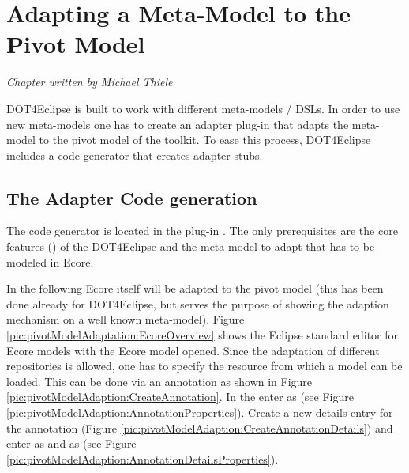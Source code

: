 \chapter{Adapting a Meta-Model to the Pivot Model}
\label{chapter:pivotModelAdaptation}

\begin{flushright}
\textit{Chapter written by Michael Thiele}
\end{flushright}

\acl{DOT4Eclipse} is built to work with different meta-models / DSLs. In order to use new meta-models one has to create an adapter plug-in that adapts the meta-model to the pivot model of the toolkit. To ease this process, \acl{DOT4Eclipse} includes a code generator that creates adapter stubs.



\section{The Adapter Code generation}

The code generator is located in the plug-in . The only prerequisites are the core features () of the \acl{DOT4Eclipse} and the meta-model to adapt that has to be modeled in Ecore.

In the following Ecore itself will be adapted to the pivot model (this has been done already for \acl{DOT4Eclipse}, but serves the purpose of showing the adaption mechanism on a well known meta-model). Figure \ref{pic:pivotModelAdaptation:EcoreOverview} shows the Eclipse standard editor for Ecore models with the Ecore model opened. Since the adaptation of different repositories is allowed, one has to specify the resource from which a model can be loaded. This can be done via an annotation as shown in Figure \ref{pic:pivotModelAdaption:CreateAnnotation}. In the  enter  as  (see Figure \ref{pic:pivotModelAdaption:AnnotationProperties}). Create a new details entry for the annotation (Figure \ref{pic:pivotModelAdaption:CreateAnnotationDetails}) and enter  as  and  as  (see Figure \ref{pic:pivotModelAdaption:AnnotationDetailsProperties}).

